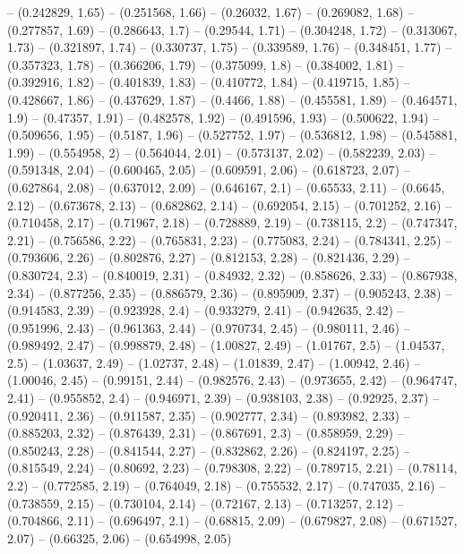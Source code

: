 -- (0.242829, 1.65)
-- (0.251568, 1.66)
-- (0.26032, 1.67)
-- (0.269082, 1.68)
-- (0.277857, 1.69)
-- (0.286643, 1.7)
-- (0.29544, 1.71)
-- (0.304248, 1.72)
-- (0.313067, 1.73)
-- (0.321897, 1.74)
-- (0.330737, 1.75)
-- (0.339589, 1.76)
-- (0.348451, 1.77)
-- (0.357323, 1.78)
-- (0.366206, 1.79)
-- (0.375099, 1.8)
-- (0.384002, 1.81)
-- (0.392916, 1.82)
-- (0.401839, 1.83)
-- (0.410772, 1.84)
-- (0.419715, 1.85)
-- (0.428667, 1.86)
-- (0.437629, 1.87)
-- (0.4466, 1.88)
-- (0.455581, 1.89)
-- (0.464571, 1.9)
-- (0.47357, 1.91)
-- (0.482578, 1.92)
-- (0.491596, 1.93)
-- (0.500622, 1.94)
-- (0.509656, 1.95)
-- (0.5187, 1.96)
-- (0.527752, 1.97)
-- (0.536812, 1.98)
-- (0.545881, 1.99)
-- (0.554958, 2)
-- (0.564044, 2.01)
-- (0.573137, 2.02)
-- (0.582239, 2.03)
-- (0.591348, 2.04)
-- (0.600465, 2.05)
-- (0.609591, 2.06)
-- (0.618723, 2.07)
-- (0.627864, 2.08)
-- (0.637012, 2.09)
-- (0.646167, 2.1)
-- (0.65533, 2.11)
-- (0.6645, 2.12)
-- (0.673678, 2.13)
-- (0.682862, 2.14)
-- (0.692054, 2.15)
-- (0.701252, 2.16)
-- (0.710458, 2.17)
-- (0.71967, 2.18)
-- (0.728889, 2.19)
-- (0.738115, 2.2)
-- (0.747347, 2.21)
-- (0.756586, 2.22)
-- (0.765831, 2.23)
-- (0.775083, 2.24)
-- (0.784341, 2.25)
-- (0.793606, 2.26)
-- (0.802876, 2.27)
-- (0.812153, 2.28)
-- (0.821436, 2.29)
-- (0.830724, 2.3)
-- (0.840019, 2.31)
-- (0.84932, 2.32)
-- (0.858626, 2.33)
-- (0.867938, 2.34)
-- (0.877256, 2.35)
-- (0.886579, 2.36)
-- (0.895909, 2.37)
-- (0.905243, 2.38)
-- (0.914583, 2.39)
-- (0.923928, 2.4)
-- (0.933279, 2.41)
-- (0.942635, 2.42)
-- (0.951996, 2.43)
-- (0.961363, 2.44)
-- (0.970734, 2.45)
-- (0.980111, 2.46)
-- (0.989492, 2.47)
-- (0.998879, 2.48)
-- (1.00827, 2.49)
-- (1.01767, 2.5)
-- (1.04537, 2.5)
-- (1.03637, 2.49)
-- (1.02737, 2.48)
-- (1.01839, 2.47)
-- (1.00942, 2.46)
-- (1.00046, 2.45)
-- (0.99151, 2.44)
-- (0.982576, 2.43)
-- (0.973655, 2.42)
-- (0.964747, 2.41)
-- (0.955852, 2.4)
-- (0.946971, 2.39)
-- (0.938103, 2.38)
-- (0.92925, 2.37)
-- (0.920411, 2.36)
-- (0.911587, 2.35)
-- (0.902777, 2.34)
-- (0.893982, 2.33)
-- (0.885203, 2.32)
-- (0.876439, 2.31)
-- (0.867691, 2.3)
-- (0.858959, 2.29)
-- (0.850243, 2.28)
-- (0.841544, 2.27)
-- (0.832862, 2.26)
-- (0.824197, 2.25)
-- (0.815549, 2.24)
-- (0.80692, 2.23)
-- (0.798308, 2.22)
-- (0.789715, 2.21)
-- (0.78114, 2.2)
-- (0.772585, 2.19)
-- (0.764049, 2.18)
-- (0.755532, 2.17)
-- (0.747035, 2.16)
-- (0.738559, 2.15)
-- (0.730104, 2.14)
-- (0.72167, 2.13)
-- (0.713257, 2.12)
-- (0.704866, 2.11)
-- (0.696497, 2.1)
-- (0.68815, 2.09)
-- (0.679827, 2.08)
-- (0.671527, 2.07)
-- (0.66325, 2.06)
-- (0.654998, 2.05)
